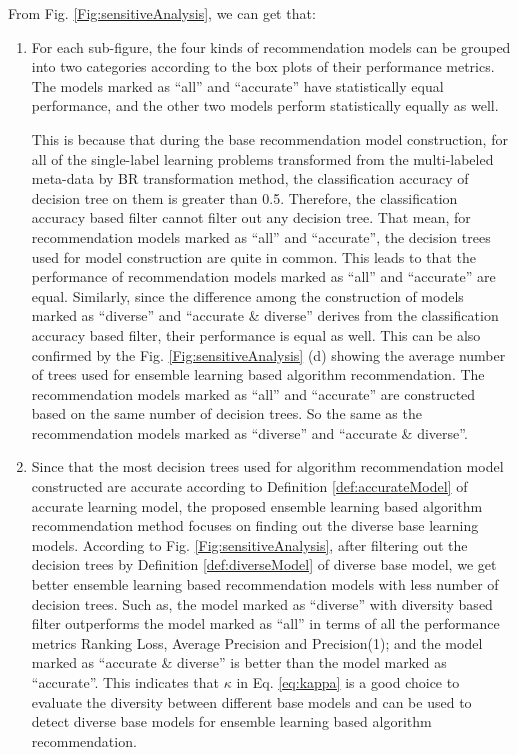 \documentclass[prodmode,acmtkdd]{acmsmall}
\begin{document}
From Fig. \ref{Fig:sensitiveAnalysis}, we can get that:
\begin{enumerate}
    \item For each sub-figure, the four kinds of recommendation models can be grouped into
    two categories according to the box plots of their
    performance metrics. The models marked as ``all'' and ``accurate''
    have statistically equal performance, and the other two models perform
    statistically equally as well.

    \quad This is because that during the base recommendation model
    construction, for all of the single-label learning problems
    transformed from the multi-labeled meta-data by BR
    transformation method, the classification accuracy of decision tree on them is greater
    than 0.5. Therefore, the classification accuracy based filter
    cannot filter out any decision tree. That mean, for
    recommendation models marked as ``all'' and
    ``accurate'', the decision trees used for model construction are
    quite in common. This leads to that the performance of recommendation
    models marked as ``all'' and ``accurate'' are equal.
    Similarly, since the difference among the construction of models
    marked as ``diverse'' and ``accurate \& diverse'' derives from the
    classification accuracy based filter, their performance is
    equal as well. This can be also confirmed by the Fig.
    \ref{Fig:sensitiveAnalysis} (d) showing the average number of
    trees used for ensemble learning based algorithm recommendation.
    The recommendation models marked as ``all'' and ``accurate'' are
    constructed based on the same number of decision trees.
    So the same as the recommendation models marked as ``diverse'' and ``accurate \&
    diverse''.

    \item Since that the most decision trees used for algorithm
    recommendation model constructed are accurate according to
    Definition \ref{def:accurateModel} of accurate learning model,
    the proposed ensemble learning based algorithm recommendation
    method focuses on finding out the diverse base learning
    models. According to Fig. \ref{Fig:sensitiveAnalysis}, after
    filtering out the decision trees by Definition
    \ref{def:diverseModel} of diverse base model, we get better
    ensemble learning based recommendation models with less
    number of decision trees. Such as, the model marked as ``diverse''
    with diversity based filter outperforms the model marked as
    ``all'' in terms of all the performance metrics Ranking Loss,
    Average Precision and Precision(1); and the model marked as
    ``accurate \& diverse'' is better than the model marked as
    ``accurate''. This indicates that $\kappa$ in Eq. \ref{eq:kappa} is a good choice to
    evaluate the diversity between different base models and can
    be used to detect diverse base models for ensemble learning
    based algorithm recommendation.
\end{enumerate}
\end{document}
